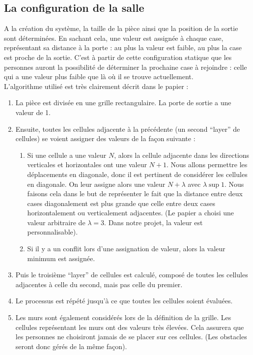 	\subsection{La configuration de la salle}
	A la création du système, la taille de la pièce ainsi que la position de la sortie sont déterminées. En sachant cela, une valeur est assignée à chaque case, représentant sa distance à la porte : au plus la valeur est faible, au plus la case est proche de la sortie. C'est à partir de cette configuration statique que les personnes auront la possibilité de déterminer la prochaine case à rejoindre : celle qui a une valeur plus faible que là où il se trouve actuellement. \\
	L'algorithme utilisé est très clairement décrit dans le papier :
	\begin{enumerate}
	\item La pièce est divisée en une grille rectangulaire. La porte de sortie a une valeur de 1.
	\item Ensuite, toutes les cellules adjacente à la précédente (un second ``layer'' de cellules) se voient assigner des valeurs de la façon suivante :
		\begin{enumerate}
			\item Si une cellule a une valeur $N$, alors la cellule adjacente dans les directions verticales et horizontales ont une valeur $N + 1$. Nous allons permettre les déplacements en diagonale, donc il est pertinent de considérer les cellules en diagonale. On leur assigne alors une valeur $N + \lambda$ avec $\lambda \sup 1$. Nous faisons cela dans le but de représenter le fait que la distance entre deux cases diagonalement est plus grande que celle entre deux cases horizontalement ou verticalement adjacentes. (Le papier a choisi une valeur arbitraire de $\lambda = 3$. Dans notre projet, la valeur est personnalisable).
			\item Si il y a un conflit lors d'une assignation de valeur, alors la valeur minimum est assignée.
		\end{enumerate}

		\item Puis le troisième ``layer'' de cellules est calculé, composé de toutes les cellules adjacentes à celle du second, mais pas celle du premier.
		\item Le processus est répété jusqu'à ce que toutes les cellules soient évaluées.
		\item Les murs sont également considérés lors de la définition de la grille. Les cellules représentant les murs ont des valeurs très élevées. Cela assurera que les personnes ne choisiront jamais de se placer sur ces cellules. (Les obstacles seront donc gérés de la même façon).
	\end{enumerate}
	

